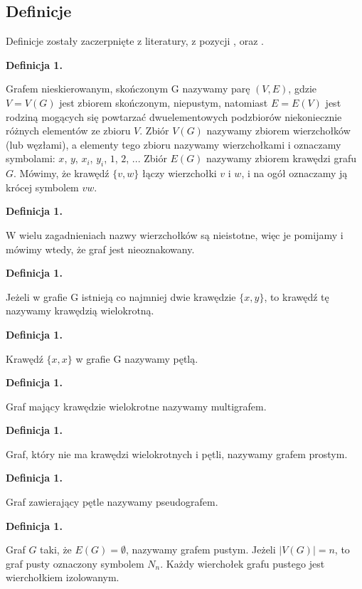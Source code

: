 \subsection{Definicje}
Definicje zostały zaczerpnięte z literatury, z pozycji \cite{Wilson2012}, \cite{Wloch2008} oraz \cite{Wojciechwoski2013}.

\newcommand{\graphDefinitionIndex}{1}
\newcommand{\incrementGraphDefinitionIndex} {
    \pgfmathtruncatemacro{\graphDefinitionIndex}{\graphDefinitionIndex + 1}
}

\noindent
\textbf{Definicja \graphDefinitionIndex.}
\incrementGraphDefinitionIndex
Grafem nieskierowanym, skończonym G nazywamy parę $(V,E)$, gdzie $V = V(G)$ jest zbiorem skończonym, niepustym,
natomiast $E = E(V)$ jest rodziną mogących się powtarzać dwuelementowych podzbiorów niekoniecznie różnych elementów ze zbioru $V$.
Zbiór $V(G)$ nazywamy zbiorem wierzchołków (lub węzłami), a elementy tego zbioru nazywamy wierzchołkami i oznaczamy symbolami:
$x$, $y$, $x_i$, $y_i$, $1$, $2$, ... Zbiór $E(G)$ nazywamy zbiorem krawędzi grafu $G$.
Mówimy, że krawędź $\{v, w\}$ łączy wierzchołki $v$ i $w$, i na ogół oznaczamy ją krócej symbolem $vw$.

\noindent
\textbf{Definicja \graphDefinitionIndex.}
\incrementGraphDefinitionIndex
W wielu zagadnieniach nazwy wierzchołków są nieistotne, więc je pomijamy i mówimy wtedy, że graf jest nieoznakowany.

\noindent
\textbf{Definicja \graphDefinitionIndex.}
\incrementGraphDefinitionIndex
Jeżeli w grafie G istnieją co najmniej dwie krawędzie $\{x, y\}$, to krawędź tę nazywamy krawędzią wielokrotną.

\noindent
\textbf{Definicja \graphDefinitionIndex.}
\incrementGraphDefinitionIndex
Krawędź $\{x, x\}$ w grafie G nazywamy pętlą.

\noindent
\textbf{Definicja \graphDefinitionIndex.}
\incrementGraphDefinitionIndex
Graf mający krawędzie wielokrotne nazywamy multigrafem.

\noindent
\textbf{Definicja \graphDefinitionIndex.}
\incrementGraphDefinitionIndex
Graf, który nie ma krawędzi wielokrotnych i pętli, nazywamy grafem prostym.

\noindent
\textbf{Definicja \graphDefinitionIndex.}
\incrementGraphDefinitionIndex
Graf zawierający pętle nazywamy pseudografem.

\noindent
\textbf{Definicja \graphDefinitionIndex.}
\incrementGraphDefinitionIndex
Graf $G$ taki, że $E(G) = \emptyset$, nazywamy grafem pustym. Jeżeli $|V(G)| = n$, to graf pusty oznaczony symbolem $N_n$.
Każdy wierchołek grafu pustego jest wierchołkiem izolowanym.

